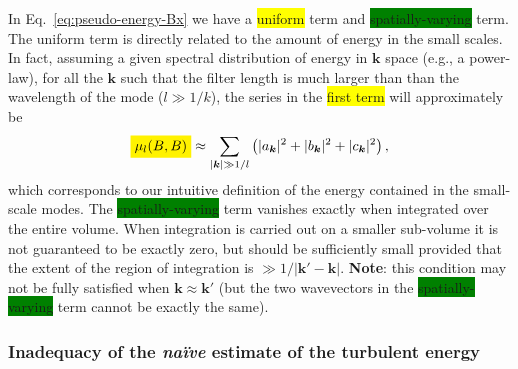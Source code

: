 \documentclass[]{article}
\newcommand{\mathcolorbox}[2]{\colorbox{#1}{$\displaystyle #2$}}
\begin{document}
%
In Eq.~\eqref{eq:pseudo-energy-Bx} we have a \colorbox{yellow}{uniform} term and \colorbox{green}{spatially-varying} term. The uniform term is directly related to the amount of energy in the small scales. In fact, assuming a given spectral distribution of energy in $\bm k$ space (e.g., a power-law), 
for all the $\bm k$ such that the filter length is much larger than than  the wavelength of the mode ($l \gg 1/k$), the series in the \colorbox{yellow}{first term} will approximately be
%
\begin{align}
	\mathcolorbox{yellow}{\mu_l(B,B)} \approx \sum_{|\bm k| \gg 1/l} \left( |a_{\bm k}|^2 + |b_{\bm k}|^2 + |c_{\bm k}|^2 \right),
\end{align}
%
which corresponds to our intuitive definition of the energy contained in the small-scale modes. The \colorbox{green}{spatially-varying} term vanishes exactly when integrated over the entire volume. When integration is carried out on a smaller sub-volume it is not guaranteed to be exactly zero, but should be sufficiently small provided that the extent of the region of integration is $\gg 1/| \bm k' - \bm k|$. \textbf{Note}: this condition may not be fully satisfied when $\bm k \approx \bm k'$ (but the two wavevectors in the \colorbox{green}{spatially-varying} term cannot be exactly the same).


\subsubsection*{Inadequacy of the \textit{na\"{i}ve} estimate of the turbulent energy}
\end{document}
